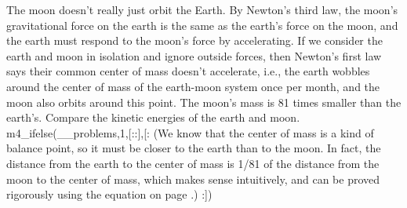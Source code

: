 The moon doesn't really just orbit the Earth. By
Newton's third law, the moon's gravitational force on the
earth is the same as the earth's force on the moon, and the
earth must respond to the moon's force by accelerating. If
we consider the earth and moon in isolation and ignore
outside forces, then Newton's first law says their common
center of mass doesn't accelerate, i.e., the earth wobbles
around the center of mass of the earth-moon system once per
month, and the moon also orbits around this point. The
moon's mass is 81 times smaller than the earth's. Compare
the kinetic energies of the earth and moon.
m4_ifelse(__problems,1,[::],[:%
(We know that the center of mass is a kind of balance point,
so it must be closer to the earth than to the moon. In fact,
the distance from the earth to the center of mass is 1/81
of the distance from the moon to the center of mass,
which makes sense intuitively, and can be proved rigorously
using the equation on page \pageref{cm-equation}.)
:])
